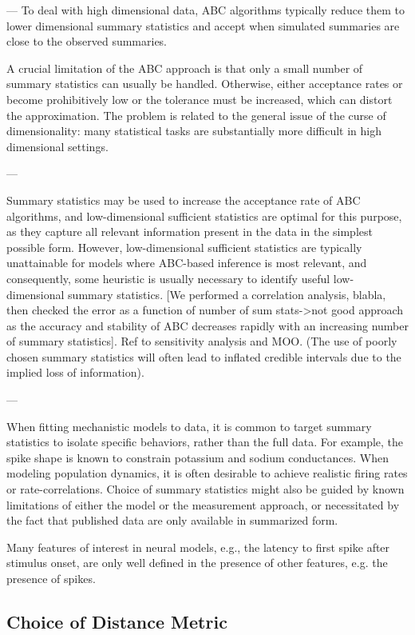 --- 
To deal with high dimensional data, ABC algorithms typically reduce them to lower dimensional summary statistics and accept when simulated summaries are close to the observed summaries. 

A crucial limitation of the ABC approach is that only a small number of summary statistics can usually be handled. Otherwise, either acceptance rates or become prohibitively low or the tolerance must be increased, which can distort the approximation. The problem is related to the general issue of the curse of dimensionality: many statistical tasks are substantially more difficult in high dimensional settings. 


--- 

Summary statistics may be used to increase the acceptance rate of ABC algorithms, and low-dimensional sufficient statistics are optimal for this purpose, as they capture all relevant information present in the data in the simplest possible form. However, low-dimensional sufficient statistics are typically unattainable for models where ABC-based inference is most relevant, and consequently, some heuristic is usually necessary to identify useful low-dimensional summary statistics. [We performed a correlation analysis, blabla, then checked the error as a function of number of sum stats->not good approach as the accuracy and stability of ABC decreases rapidly with an increasing number of summary statistics]. Ref to sensitivity analysis and MOO. (The use of poorly chosen summary statistics will often lead to inflated credible intervals due to the implied loss of information).

---

When fitting mechanistic models to data, it is common to target summary statistics to isolate specific behaviors, rather than the full data. For example, the spike shape is known to constrain potassium and sodium conductances. When modeling population dynamics, it is often desirable to achieve realistic firing rates or rate-correlations. Choice of summary statistics might also be guided by known limitations of either the model or the measurement approach, or necessitated by the fact that published data are only available in summarized form. 

Many features of interest in neural models, e.g., the latency to first spike after stimulus onset, are only well defined in the presence of other features, e.g. the presence of spikes. 

\subsection{Choice of Distance Metric}

